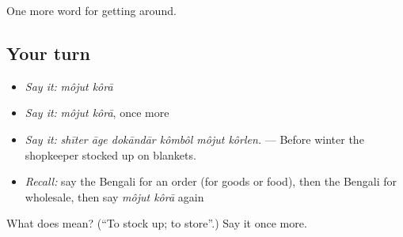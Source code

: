 \begin{grammarlens}[title={What you've built}]
One more word for getting around.
\end{grammarlens}

\subsection*{Your turn}
\begin{itemize}
\raggedright
  \item \emph{Say it:} \emph{môjut kôrā}
  \item \emph{Say it:} \emph{môjut kôrā}, once more
  \item \emph{Say it:} \emph{shīter āge dokāndār kômbôl môjut kôrlen.} — Before winter the shopkeeper stocked up on blankets.
  \item \emph{Recall:} say the Bengali for an order (for goods or food), then the Bengali for wholesale, then say \emph{môjut kôrā} again
\end{itemize}

\begin{tcolorbox}[breakable,colback=teal!4,colframe=teal!35!black,title={Before you move on}]
What does   mean? (\textquotedblleft{}To stock up; to store\textquotedblright{}.) Say it once more.
\end{tcolorbox}
